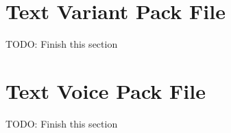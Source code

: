\section{Text Variant Pack File}
\label{sec:pftxtV}

TODO: Finish this section


\section{Text Voice Pack File}
\label{sec:pftxtv}

TODO: Finish this section



